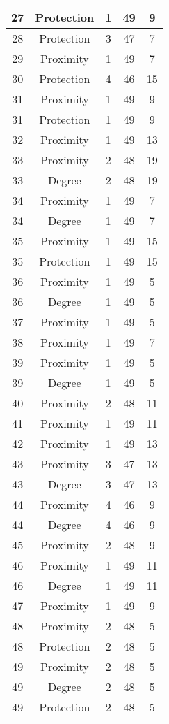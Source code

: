 \documentclass[results.tex]{subfiles}
\begin{document}
\begin{center}
\begin{tabular}{| c || c | c | c | c |}
    27 & Protection & 1 & 49 & 9 \\ 
    \hline
    28 & Protection & 3 & 47 & 7 \\ 
    \hline
    29 & Proximity & 1 & 49 & 7 \\ 
    \hline
    30 & Protection & 4 & 46 & 15 \\ 
    \hline
    31 & Proximity & 1 & 49 & 9 \\ 
    \hline
    31 & Protection & 1 & 49 & 9 \\ 
    \hline
    32 & Proximity & 1 & 49 & 13 \\ 
    \hline
    33 & Proximity & 2 & 48 & 19 \\ 
    \hline
    33 & Degree & 2 & 48 & 19 \\ 
    \hline
    34 & Proximity & 1 & 49 & 7 \\ 
    \hline
    34 & Degree & 1 & 49 & 7 \\ 
    \hline
    35 & Proximity & 1 & 49 & 15 \\ 
    \hline
    35 & Protection & 1 & 49 & 15 \\ 
    \hline
    36 & Proximity & 1 & 49 & 5 \\ 
    \hline
    36 & Degree & 1 & 49 & 5 \\ 
    \hline
    37 & Proximity & 1 & 49 & 5 \\ 
    \hline
    38 & Proximity & 1 & 49 & 7 \\ 
    \hline
    39 & Proximity & 1 & 49 & 5 \\ 
    \hline
    39 & Degree & 1 & 49 & 5 \\ 
    \hline
    40 & Proximity & 2 & 48 & 11 \\ 
    \hline
    41 & Proximity & 1 & 49 & 11 \\ 
    \hline
    42 & Proximity & 1 & 49 & 13 \\ 
    \hline
    43 & Proximity & 3 & 47 & 13 \\ 
    \hline
    43 & Degree & 3 & 47 & 13 \\ 
    \hline
    44 & Proximity & 4 & 46 & 9 \\ 
    \hline
    44 & Degree & 4 & 46 & 9 \\ 
    \hline
    45 & Proximity & 2 & 48 & 9 \\ 
    \hline
    46 & Proximity & 1 & 49 & 11 \\ 
    \hline
    46 & Degree & 1 & 49 & 11 \\ 
    \hline
    47 & Proximity & 1 & 49 & 9 \\ 
    \hline
    48 & Proximity & 2 & 48 & 5 \\ 
    \hline
    48 & Protection & 2 & 48 & 5 \\ 
    \hline
    49 & Proximity & 2 & 48 & 5 \\ 
    \hline
    49 & Degree & 2 & 48 & 5 \\ 
    \hline
    49 & Protection & 2 & 48 & 5 \\ 
    \hline   \end{tabular}
\end{center}
\end{document}
